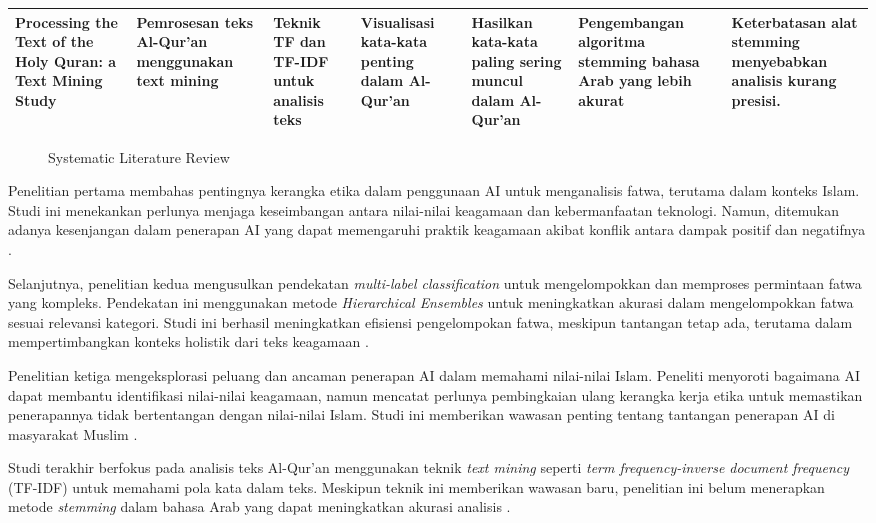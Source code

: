 \documentclass[12pt,a4paper]{article}
\begin{document}
\begin{longtable}{|p{2cm}|p{2cm}|p{2cm}|p{2cm}|p{2cm}|p{2.5cm}|p{2.5cm}|}
Processing the Text of the Holy Quran: a Text Mining Study & Pemrosesan teks Al-Qur'an menggunakan text mining & Teknik TF dan TF-IDF untuk analisis teks & Visualisasi kata-kata penting dalam Al-Qur'an & Hasilkan kata-kata paling sering muncul dalam Al-Qur'an & Pengembangan algoritma stemming bahasa Arab yang lebih akurat & Keterbatasan alat stemming menyebabkan analisis kurang presisi. \\ \hline

\end{longtable}

\begin{figure}[h!]
    \centering
    \caption{Systematic Literature Review}
    \label{fig:slr}
\end{figure}

\newpage
 Penelitian pertama membahas pentingnya kerangka etika dalam penggunaan AI untuk menganalisis fatwa, terutama dalam konteks Islam. Studi ini menekankan perlunya menjaga keseimbangan antara nilai-nilai keagamaan dan kebermanfaatan teknologi. Namun, ditemukan adanya kesenjangan dalam penerapan AI yang dapat memengaruhi praktik keagamaan akibat konflik antara dampak positif dan negatifnya \cite{Hakim2023}.

 Selanjutnya, penelitian kedua mengusulkan pendekatan \textit{multi-label classification }untuk mengelompokkan dan memproses permintaan fatwa yang kompleks. Pendekatan ini menggunakan metode \textit{Hierarchical Ensembles} untuk meningkatkan akurasi dalam mengelompokkan fatwa sesuai relevansi kategori. Studi ini berhasil meningkatkan efisiensi pengelompokan fatwa, meskipun tantangan tetap ada, terutama dalam mempertimbangkan konteks holistik dari teks keagamaan \cite{Zayed2015}.

 Penelitian ketiga mengeksplorasi peluang dan ancaman penerapan AI dalam memahami nilai-nilai Islam. Peneliti menyoroti bagaimana AI dapat membantu identifikasi nilai-nilai keagamaan, namun mencatat perlunya pembingkaian ulang kerangka kerja etika untuk memastikan penerapannya tidak bertentangan dengan nilai-nilai Islam. Studi ini memberikan wawasan penting tentang tantangan penerapan AI di masyarakat Muslim \cite{Rohman2023}.

 Studi terakhir berfokus pada analisis teks Al-Qur'an menggunakan teknik \textit{text mining }seperti \textit{term frequency-inverse document frequency} (TF-IDF) untuk memahami pola kata dalam teks. Meskipun teknik ini memberikan wawasan baru, penelitian ini belum menerapkan metode \textit{stemming} dalam bahasa Arab yang dapat meningkatkan akurasi analisis \cite{Alhawarat2015}.
\end{document}
